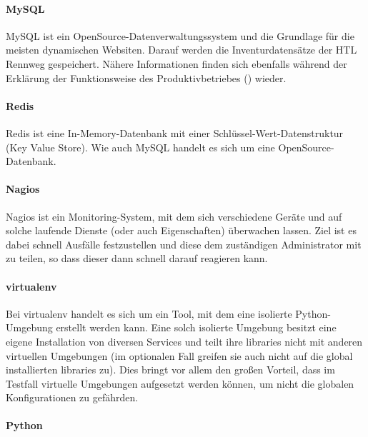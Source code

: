 \hypertarget{mysql}{%
\paragraph{MySQL}\label{mysql}}

MySQL ist ein OpenSource-Datenverwaltungssystem und die Grundlage für
die meisten dynamischen Websiten. Darauf werden die Inventurdatensätze
der HTL Rennweg gespeichert. Nähere Informationen finden sich ebenfalls
während der Erklärung der Funktionsweise des Produktivbetriebes
() wieder.

\hypertarget{redis}{%
\paragraph{Redis}\label{redis}}

Redis ist eine In-Memory-Datenbank mit einer
Schlüssel-Wert-Datenstruktur (Key Value Store). Wie auch MySQL handelt
es sich um eine OpenSource-Datenbank.

\hypertarget{nagios}{%
\paragraph{Nagios}\label{nagios}}

Nagios ist ein Monitoring-System, mit dem sich verschiedene Geräte und
auf solche laufende Dienste (oder auch Eigenschaften) überwachen lassen.
Ziel ist es dabei schnell Ausfälle festzustellen und diese dem
zuständigen Administrator mit zu teilen, so dass dieser dann schnell
darauf reagieren kann.

\hypertarget{virtualenv}{%
\paragraph{virtualenv}\label{virtualenv}}

Bei virtualenv handelt es sich um ein Tool, mit dem eine isolierte
Python-Umgebung erstellt werden kann. Eine solch isolierte Umgebung
besitzt eine eigene Installation von diversen Services und teilt ihre
libraries nicht mit anderen virtuellen Umgebungen (im optionalen Fall
greifen sie auch nicht auf die global installierten libraries zu). Dies
bringt vor allem den großen Vorteil, dass im Testfall virtuelle
Umgebungen aufgesetzt werden können, um nicht die globalen
Konfigurationen zu gefährden.

\hypertarget{python}{%
\paragraph{Python}\label{python}}

